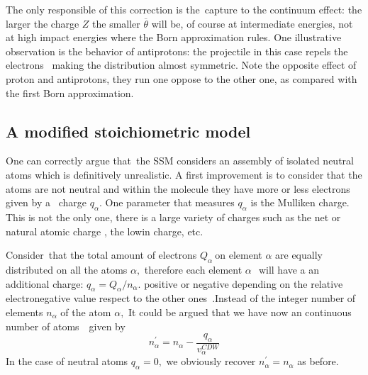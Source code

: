 \documentclass[preprint,showpacs,pra]{revtex4}
\begin{document}
The only responsible of this correction is the\ capture to the continuum
effect: the larger the charge $Z$ the smaller $\overline{\theta }$ will be,
of course at intermediate energies, not at high impact energies where the
Born approximation rules. One illustrative observation is the behavior of
antiprotons: the projectile in this case repels the electrons \ making the
distribution almost symmetric. Note the opposite effect of proton and
antiprotons, they run one oppose to the other one, as compared with the
first Born approximation.

\subsection{A modified stoichiometric model}

One can correctly argue that\ the SSM considers an assembly of isolated
neutral atoms which is definitively unrealistic. A first improvement is to
consider that the atoms are not neutral and within the molecule they have
more or less electrons given by a \ charge $q_{\alpha }$. One parameter that
measures $q_{\alpha }$ is the Mulliken charge. This is not the only one,
there is a large variety of charges such as the net or natural atomic charge 
\cite{lee2003}, the lowin charge, etc.

Consider\ that the total amount of electrons $Q_{\alpha }\ $on element $%
\alpha $ are equally distributed on all the atoms $\alpha ,$ therefore each
element $\alpha \ $\ will have a an additional charge: $q_{\alpha
}=Q_{\alpha }/n_{\alpha }$. positive or negative depending on the relative
electronegative value respect to the other ones\ \cite{rappe1991}$.$Instead
of the integer number of elements $n_{\alpha }$ of the atom $\alpha ,$ It
could be argued that we have now an continuous number of atoms\ \ given by 
\begin{equation}
n_{\alpha }^{\prime }=n_{\alpha }-\frac{q_{\alpha }}{v_{\alpha }^{CDW}}
\label{100}
\end{equation}%
In the case of neutral atoms $q_{\alpha }=0,$ we obviously recover $%
n_{\alpha }^{\prime }=n_{\alpha }$ as before$.$
\end{document}
